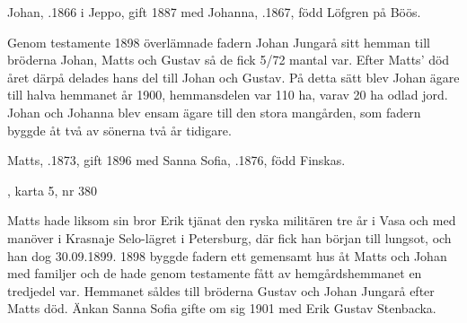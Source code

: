 %
Johan, .1866 i Jeppo, gift 1887 med Johanna, .1867, född Löfgren på Böös.
\begin{jhchildren}
  \item {}
  \item {}
  \item {}
  \item {}
  \item {}
  \item {}
\end{jhchildren}
Genom testamente 1898 överlämnade fadern Johan Jungarå sitt hemman till bröderna Johan, Matts och Gustav så de fick 5/72 mantal var. Efter Matts' död året därpå delades hans del till Johan och Gustav. På detta sätt blev Johan ägare till halva hemmanet år 1900, hemmansdelen var 110 ha, varav 20 ha odlad jord. Johan och Johanna blev ensam ägare till den stora mangården, som fadern byggde åt två av sönerna två år tidigare.


%
Matts, .1873, gift 1896 med Sanna Sofia, .1876, född Finskas.
\begin{jhchildren}
  \item {}
  \item {}, karta 5, nr 380
\end{jhchildren}
Matts hade liksom sin bror Erik tjänat den ryska militären tre år i Vasa och med manöver i Krasnaje Selo-lägret i Petersburg, där fick han början till lungsot, och han dog 30.09.1899. 1898 byggde fadern ett gemensamt hus åt Matts och Johan med familjer och de hade genom testamente fått av hemgårdshemmanet en tredjedel var. Hemmanet såldes till bröderna Gustav och Johan Jungarå efter Matts död. Änkan Sanna Sofia gifte om sig 1901 med Erik Gustav Stenbacka.



